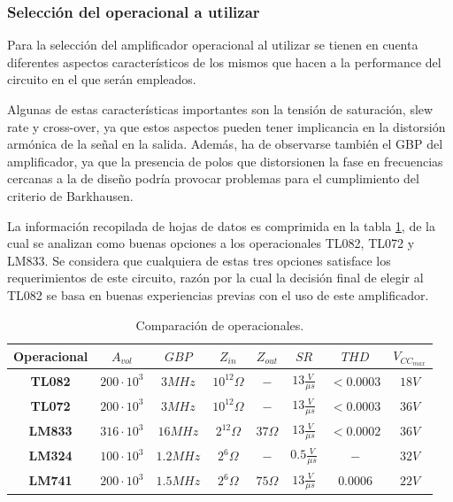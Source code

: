 \subsubsection{Selección del operacional a utilizar}
Para la selección del amplificador operacional al utilizar se tienen en cuenta diferentes aspectos característicos de los mismos que hacen a la 
performance del circuito en el que serán empleados.

Algunas de estas características importantes son la tensión de saturación, slew rate y cross-over, ya que estos aspectos pueden tener implicancia en la 
distorsión armónica de la señal en la salida.
Además, ha de observarse también el GBP del amplificador, ya que la presencia de polos que distorsionen la fase en frecuencias cercanas a la de diseño 
podría provocar problemas para el cumplimiento del criterio de Barkhausen.

La información recopilada de hojas de datos es comprimida en la tabla \ref{tab:opamp_comparison_ex1}, de la cual se analizan como buenas opciones a los 
operacionales TL082, TL072 y LM833.
Se considera que cualquiera de estas tres opciones satisface los requerimientos de este circuito, razón por la cual la decisión final de elegir al TL082 
se basa en buenas experiencias previas con el uso de este amplificador.
\begin{table}[H]
    \centering
    \begin{tabular}{c|ccccccc}
    \textbf{Operacional} & \textbf{$A_{vol}$} & \textbf{$GBP$} & \textbf{$Z_{in}$} & \textbf{$Z_{out}$} & \textbf{$SR$}         & \textbf{$THD$} & \textbf{$V_{CC_{max}}$} \\ \hline
    \textbf{TL082}       & $200 \cdot 10^3$   & $3MHz$         & $10^12\Omega$     & $-$                & $13 \frac{V}{\mu s}$  & $< 0.0003$     & $18V$                   \\
    \textbf{TL072}       & $200 \cdot 10^3$   & $3MHz$         & $10^12\Omega$     & $-$                & $13 \frac{V}{\mu s}$  & $< 0.0003$     & $36V$                   \\
    \textbf{LM833}       & $316 \cdot 10^3$   & $16MHz$        & $2^12\Omega$      & $37\Omega$         & $13 \frac{V}{\mu s}$  & $< 0.0002$     & $36V$                   \\
    \textbf{LM324}       & $100 \cdot 10^3$   & $1.2MHz$       & $2^6\Omega$       & $-$                & $0.5 \frac{V}{\mu s}$ & $-$            & $32V$                   \\
    \textbf{LM741}       & $200 \cdot 10^3$   & $1.5MHz$       & $2^6\Omega$       & $75\Omega$         & $13 \frac{V}{\mu s}$  & $0.0006$       & $22V$                  
    \end{tabular}
    \caption{Comparación de operacionales.}
    \label{tab:opamp_comparison_ex1}
\end{table}



